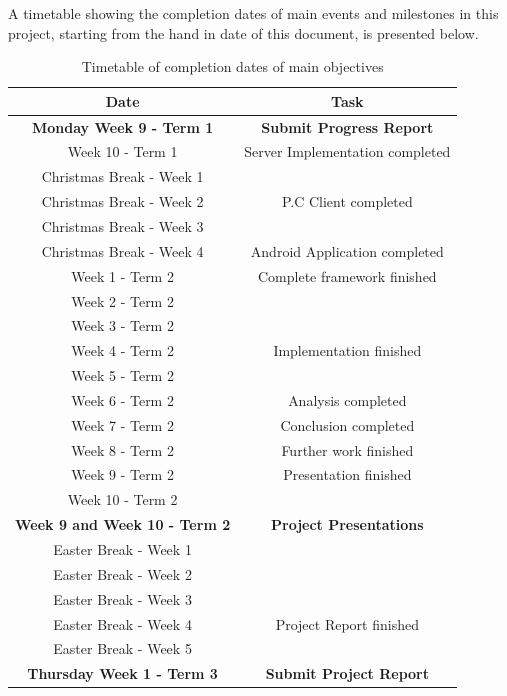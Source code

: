 \documentclass[a4paper,11pt]{article}
\begin{document}
A timetable showing the completion dates of main events and milestones in this project, starting from the hand in date of this document, is presented below.

\begin{table}[htbp]
\begin{tabular}{|c|c|}
\hline
Date & Task \\ \hline
\textbf{Monday Week 9 - Term 1} & \textbf{Submit Progress Report} \\ \hline
Week 10 - Term 1 & Server Implementation completed \\ \hline
Christmas Break - Week 1 &  \\ \hline
Christmas Break - Week 2 & P.C Client completed \\ \hline
Christmas Break - Week 3 &  \\ \hline
Christmas Break - Week 4 & Android Application completed \\ \hline
Week 1 - Term 2 & Complete framework finished \\ \hline
Week 2 - Term 2 &  \\ \hline
Week 3 - Term 2 &  \\ \hline
Week 4 - Term 2 & Implementation finished \\ \hline
Week 5 - Term 2 &  \\ \hline
Week 6 - Term 2 & Analysis completed \\ \hline
Week 7 - Term 2 & Conclusion completed \\ \hline
Week 8 - Term 2 & Further work finished \\ \hline
Week 9 - Term 2 & Presentation finished \\ \hline
Week 10 - Term 2 &  \\ \hline
\textbf{Week 9 and Week 10 - Term 2} & \textbf{Project Presentations} \\ \hline
Easter Break - Week 1 &  \\ \hline
Easter Break - Week 2 &  \\ \hline
Easter Break - Week 3 &  \\ \hline
Easter Break - Week 4 & Project Report finished \\ \hline
Easter Break - Week 5 &  \\ \hline
\textbf{Thursday Week 1 - Term 3} & \textbf{Submit Project Report} \\ \hline
\end{tabular}
\caption{Timetable of completion dates of main objectives}
\label{timetable}
\end{table}
\end{document}
